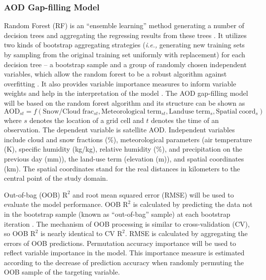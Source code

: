 \documentclass[11pt]{article}
\begin{document}
\subsubsection{AOD Gap-filling Model}
Random Forest (RF) is an ``ensemble learning'' method generating a number of decision trees and aggregating the regressing results from these trees \citep{Breiman2001, Liaw2002}. It utilizes two kinds of bootstrap aggregating strategies (\textit{i.e.,} generating new training sets by sampling from the original training set uniformly with replacement) for each decision tree -- a bootstrap sample and a group of randomly chosen independent variables, which allow the random forest to be a robust algorithm against overfitting \citep{Breiman2001}. It also provides variable importance measures to inform variable weights and help in the interpretation of the model \citep{Liaw2002}. The AOD gap-filling model will be based on the random forest algorithm and its structure can be shown as 
\begin{equation}
\label{emu:aod}
\mathrm{
AOD_{\mathit{st}} = \mathit{f}(Snow/Cloud\;frac_{\mathit{st}}, Meteorological\;term_{\mathit{st}}, Landuse\;term_\mathit{s}, Spatial\;coord_\mathit{s})
}
\end{equation}
where $s$ denotes the location of a grid cell and $t$ denotes the time of an observation. The dependent variable is satellite AOD. Independent variables include cloud and snow fractions (\%), meteorological parameters (air temperature (K), specific humidity (kg/kg), relative humidity (\%), and precipitation on the previous day (mm)), the land-use term (elevation (m)), and spatial coordinates (km). The spatial coordinates stand for the real distances in kilometers to the central point of the study domain.

Out-of-bag (OOB) $\mathrm{R^2}$ and root mean squared error (RMSE) will be used to evaluate the model performance. OOB $\mathrm{R^2}$ is calculated by predicting the data not in the bootstrap sample (known as ``out-of-bag'' sample) at each bootstrap iteration \citep{Breiman2001}. The mechanism of OOB processing is similar to cross-validation (CV), so OOB $\mathrm{R^2}$ is nearly identical to CV $\mathrm{R^2}$. RMSE is calculated by aggregating the errors of OOB predictions. Permutation accuracy importance \citep{Breiman2002} will be used to reflect variable importance in the model. This importance measure is estimated according to the decrease of prediction accuracy when randomly permuting the OOB sample of the targeting variable.
\end{document}
